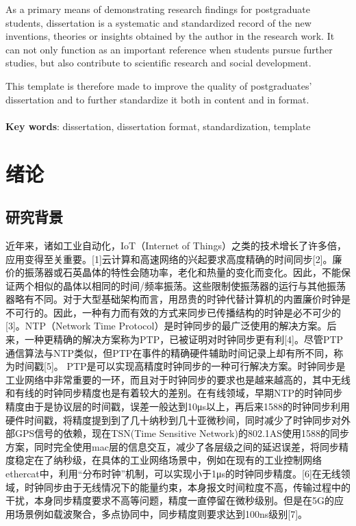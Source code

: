 \documentclass[UTF8,a4paper,12pt]{ctexart}
\numberwithin{equation}{section}
\begin{document}
\hspace{8mm}As a primary means of demonstrating research findings for postgraduate students, dissertation is a systematic and standardized record of the new inventions, theories or insights obtained by the author in the research work. It can not only function as an important reference when students pursue further studies, but also contribute to scientific research and social development.\par 
This template is therefore made to improve the quality of postgraduates’ dissertation and to further standardize it both in content and in format.\\
~\\ 
\textbf{Key words}: dissertation, dissertation format, standardization, template

\newpage
\renewcommand\contentsname{\textbf{目\quad录}}
\begin{center}
{\tableofcontents
\thispagestyle{fancy}
}
\end{center}

\newpage
{}
\section{绪论}
\subsection{研究背景}
近年来，诸如工业自动化，IoT（Internet of Things）之类的技术增长了许多倍，应用变得至关重要。[1]云计算和高速网络的兴起要求高度精确的时间同步[2]。廉价的振荡器或石英晶体的特性会随功率，老化和热量的变化而变化。因此，不能保证两个相似的晶体以相同的时间/频率振荡。这些限制使振荡器的运行与其他振荡器略有不同。对于大型基础架构而言，用昂贵的时钟代替计算机的内置廉价时钟是不可行的。因此，一种有力而有效的方式来同步已传播结构的时钟是必不可少的[3]。NTP（Network Time Protocol）是时钟同步的最广泛使用的解决方案。后来，一种更精确的解决方案称为PTP，已被证明对时钟同步更有利[4]。尽管PTP通信算法与NTP类似，但PTP在事件的精确硬件辅助时间记录上却有所不同，称为时间戳[5]。 PTP是可以实现高精度时钟同步的一种可行解决方案。时钟同步是工业网络中非常重要的一环，而且对于时钟同步的要求也是越来越高的，其中无线和有线的时钟同步精度也是有着较大的差别。在有线领域，早期NTP的时钟同步精度由于是协议层的时间戳，误差一般达到10μs以上，再后来1588的时钟同步利用硬件时间戳，将精度提到到了几十纳秒到几十亚微秒间，同时减少了时钟同步对外部GPS信号的依赖，现在TSN(Time Sensitive Network)的802.1AS使用1588的同步方案，同时完全使用mac层的信息交互，减少了各层级之间的延迟误差，将同步精度稳定在了纳秒级，在具体的工业网络场景中，例如在现有的工业控制网络ethercat中，利用“分布时钟”机制，可以实现小于1μs的时钟同步精度。[6]在无线领域，时钟同步由于无线情况下的能量约束，本身报文时间粒度不高，传输过程中的干扰，本身同步精度要求不高等问题，精度一直停留在微秒级别。但是在5G的应用场景例如载波聚合，多点协同中，同步精度则要求达到100ns级别[7]。
\end{document}
